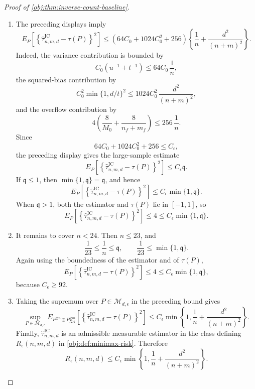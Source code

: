 \begin{proof}[Proof of \cref{obj:thm:inverse-count-baseline}]
\begin{enumerate}
\item The preceding displays imply
\[
E_P\!\left[
\left\{\widehat\tau^{\mathrm{IC}}_{n,m,d}-\tau(P)\right\}^2
\right]
\le
\left(64C_0+1024C_0^2+256\right)
\left\{
\frac1n+\frac{d^2}{(n+m)^2}
\right\}.
\]
Indeed, the variance contribution is bounded by
\[
C_0(u^{-1}+t^{-1})\le 64C_0\,\frac1n,
\]
the squared-bias contribution by
\[
C_0^2\min\{1,d/t\}^2
\le
1024C_0^2\,\frac{d^2}{(n+m)^2},
\]
and the overflow contribution by
\[
4\left(\frac8{M_0}+\frac8{n_f+m_f}\right)
\le
256\,\frac1n .
\]
Since
\[
64C_0+1024C_0^2+256\le C_\epsilon,
\]
the preceding display gives the large-sample estimate
\[
E_P\!\left[
\left\{\widehat\tau^{\mathrm{IC}}_{n,m,d}-\tau(P)\right\}^2
\right]
\le
C_\epsilon\mathfrak q .
\]
If \(\mathfrak q\le1\), then \(\min\{1,\mathfrak q\}=\mathfrak q\), and hence
\[
E_P\!\left[
\left\{\widehat\tau^{\mathrm{IC}}_{n,m,d}-\tau(P)\right\}^2
\right]
\le
C_\epsilon\min\{1,\mathfrak q\}.
\]
When \(\mathfrak q>1\), both the estimator and \(\tau(P)\) lie in \([-1,1]\), so
\[
E_P\!\left[
\left\{\widehat\tau^{\mathrm{IC}}_{n,m,d}-\tau(P)\right\}^2
\right]\le4
\le C_\epsilon\min\{1,\mathfrak q\}.
\]

\item It remains to cover \(n<24\).  Then \(n\le23\), and
\[
\frac1{23}\le \frac1n\le \mathfrak q,
\qquad
\frac1{23}\le \min\{1,\mathfrak q\}.
\]
Again using the boundedness of the estimator and of \(\tau(P)\),
\[
E_P\!\left[
\left\{\widehat\tau^{\mathrm{IC}}_{n,m,d}-\tau(P)\right\}^2
\right]\le4
\le
C_\epsilon\min\{1,\mathfrak q\},
\]
because \(C_\epsilon\ge92\). %

\item Taking the supremum over \(P\in\mathcal M_{d,\epsilon}\) in the preceding bound gives
\[
\sup_{P\in\mathcal M_{d,\epsilon}}
E_{P^{\otimes n}\otimes P_{XA}^{\otimes m}}
\left[
\left\{
\widehat\tau^{\mathrm{IC}}_{n,m,d}-\tau(P)
\right\}^2
\right]
\le
C_\epsilon
\min\left\{
1,\frac1n+\frac{d^2}{(n+m)^2}
\right\}.
\]
Finally, \(\widehat\tau^{\mathrm{IC}}_{n,m,d}\) is an admissible measurable estimator in the class defining \(R_\epsilon(n,m,d)\) in \cref{obj:def:minimax-risk}.  Therefore
\[
R_\epsilon(n,m,d)
\le
C_\epsilon
\min\left\{
1,\frac1n+\frac{d^2}{(n+m)^2}
\right\}.
\]
\end{enumerate}
\end{proof}

